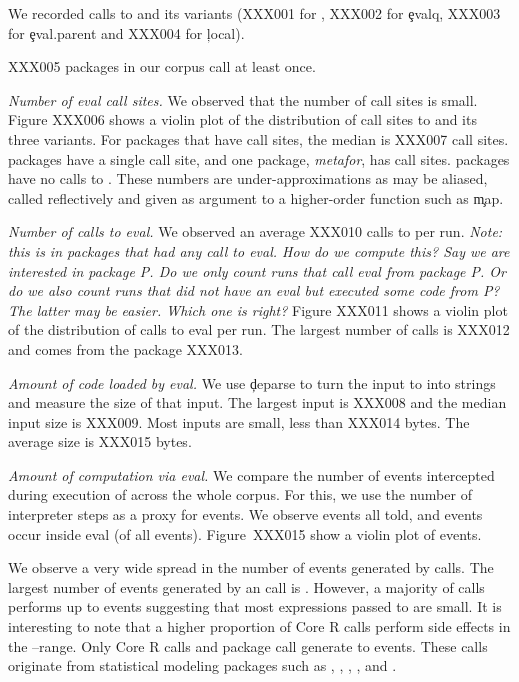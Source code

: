\documentclass[USenglish,cleveref, autoref, thm-restate]{lipics-v2019}
\newcommand{\mypara}[1]{\medskip\noindent\emph{#1}\xspace}
\newcommand{\NOTE}[1]{{\it Note: #1}\xspace}
\begin{document}
We recorded \AllAllCallCountRnd calls to \eval and its variants (XXX001
for \eval, XXX002 for \c{evalq}, XXX003 for \c{eval.parent} and XXX004 for
\c{local}).

XXX005 packages in our corpus call \eval at least once.


\mypara{Number of eval call sites.}
We observed that the number of \eval call sites is small.
Figure XXX006 shows a violin plot of the distribution of call sites to
\eval and its three variants. For packages that have call sites, the
median is XXX007 call sites. \OneCallSitesEnrich{} packages have a
single call site, and one package, \emph{metafor}, has
\MaxCallSitesEnrich{} call sites. \NoCallSitesEnrich{} packages have
no calls to \eval. These numbers are under-approximations as \eval may
be aliased, called reflectively and given as argument to a
higher-order function such as \c{map}.


\mypara{Number of calls to eval.} We observed an average XXX010 calls
to \eval per run. \NOTE{this is in packages that had any call to eval.
  How do we compute this? Say we are interested in package P. Do we
  only count runs that call eval from package P. Or do we also count
  runs that did not have an eval but executed some code from P? The
  latter may be easier. Which one is right?} Figure XXX011 shows a
violin plot of the distribution of calls to eval per run. The largest
number of calls is XXX012 and comes from the package XXX013.

\mypara{Amount of code loaded by eval.} We use \c{deparse} to turn the
input to \eval into strings and measure the size of that input. The
largest input is XXX008 and the median input size is XXX009. Most
inputs are small, less than XXX014 bytes. The average size is XXX015
bytes.

\mypara{Amount of computation via eval.}
We compare the number of events intercepted during execution of \eval
across the whole corpus. For this, we use the number of interpreter
steps as a proxy for events. We observe \AllEventCountRnd events all
told, and \EvalEventCountRnd events occur inside eval
(\EvalEventAllPerc of all events).
Figure~XXX015 show a violin plot of events.

We observe a very wide spread in the number of events generated by
\eval calls. The largest number of events generated by an \eval call
is \EventsMaxCountRnd. However, a majority of \eval calls performs up
to \EventsMaxRangeA events suggesting that most expressions passed to
\eval are small. It is interesting to note that a higher proportion of
Core R \eval calls perform side effects in the
\EventsMinRangeB--\EventsMaxRangeB range. Only \EventsCoreEvalCountC
Core R \eval calls and \EventsPackageEvalCountC package \eval call
generate \EventsMinRangeC to \EventsMaxRangeC events. These \eval
calls originate from statistical modeling packages such as \mlogit,
\mboost, \metafor, \lavaan, \mclust and \gamlss.
\end{document}
